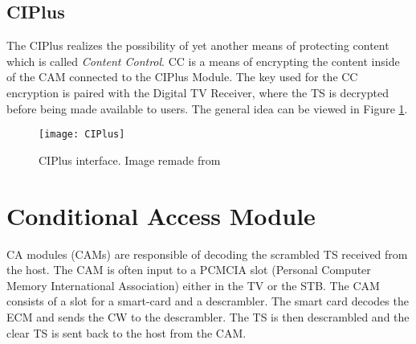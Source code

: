\subsection{CIPlus}
The CIPlus realizes the possibility of yet another means of protecting content 
which is called \emph{Content Control}. CC is a means of encrypting the content 
inside of the CAM connected to the CIPlus Module. The key used for the CC 
encryption is paired with the Digital TV Receiver, where the TS is decrypted 
before being made available to users. The general idea can be viewed in Figure 
\ref{img:CIPlus}.

\begin{figure}
  \centering
  \texttt{[image: CIPlus]}
  \caption{CIPlus interface. Image remade from \citep[p. 10]{CI+:2011}}
  \label{img:CIPlus}
\end{figure}


\section{Conditional Access Module}\label{sec:CAM}
CA modules (CAMs) are responsible of decoding the scrambled TS 
received from the host. The CAM is often input to a PCMCIA slot 
(Personal Computer Memory International Association) either in the TV 
or the STB. The CAM consists of a slot for a smart-card and a 
descrambler. The smart card decodes the ECM and sends the CW to the 
descrambler. The TS is then descrambled and the clear TS is sent back 
to the host from the CAM.
